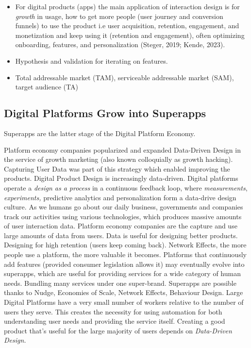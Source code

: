 \documentclass[
  letterpaper,
  DIV=11,
  numbers=noendperiod]{scrartcl}
\begin{document}
\begin{itemize}
\item
  For digital products (apps) the main application of interaction design
  is for \emph{growth} in usage, how to get more people (user journey
  and conversion funnels) to use the product i.e user acquisition,
  retention, engagement, and monetization and keep using it (retention
  and engagement), often optimizing onboarding, features, and
  personalization (Steger, 2019; Kende, 2023).
\item
  Hypothesis and validation for iterating on features.
\item
  Total addressable market (TAM), serviceable addressable market (SAM),
  target audience (TA)
\end{itemize}

\subsection{Digital Platforms Grow into
Superapps}\label{digital-platforms-grow-into-superapps}

Superapps are the latter stage of the Digital Platform Economy.

Platform economy companies popularized and expanded Data-Driven Design
in the service of growth marketing (also known colloquially as growth
hacking). Capturing User Data was part of this strategy which enabled
improving the products. Digital Product Design is increasingly
data-driven. Digital platforms operate a \emph{design as a process} in a
continuous feedback loop, where \emph{measurements}, \emph{experiments,}
predictive analytics and personalization form a data-drive design
culture. As we humans go about our daily business, governments and
companies track our activities using various technologies, which
produces massive amounts of user interaction data. Platform economy
companies are the capture and use large amounts of data from users. Data
is useful for designing better products. Designing for high retention
(users keep coming back). Network Effects, the more people use a
platform, the more valuable it becomes. Platforms that continuously add
features (provided consumer legislation allows it) may eventually evolve
into superapps, which are useful for providing services for a wide
category of human needs. Bundling many services under one super-brand.
Superapps are possible thanks to Nudge, Economies of Scale, Network
Effects, Behaviour Design. Large Digital Platforms have a very small
number of workers relative to the number of users they serve. This
creates the necessity for using automation for both understanding user
needs and providing the service itself. Creating a good product that's
useful for the large majority of users depends on \emph{Data-Driven
Design.}
\end{document}
